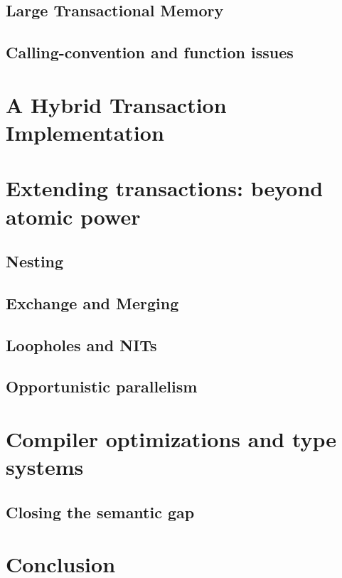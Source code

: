 \documentclass{phd-thesis}
\begin{document}
\section{Large Transactional Memory}
\section{Calling-convention and function issues}


\chapter{A Hybrid Transaction Implementation}\label{sec:hybrid}


\chapter[Extending transactions]{Extending transactions: beyond atomic power}

\section{Nesting}
\section{Exchange and Merging}
\section{Loopholes and NITs}
\section{Opportunistic parallelism}

\chapter[Optimizations and type systems]{Compiler optimizations and type systems}
\section{Closing the semantic gap}\label{sec:safe-transactify}

\chapter{Conclusion}
\appendix
\end{document}

